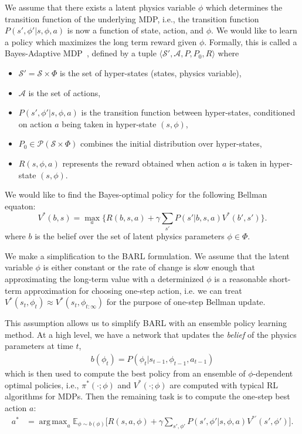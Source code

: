 \documentclass{article}
\DeclareMathOperator*{\argmax}{arg\,max}
\begin{document}
We assume that there exists a latent physics variable $\phi$ which determines the transition function of the underlying MDP, i.e., the transition function  $P(s',\phi' |s, \phi, a)$ is now a function of state, action, and $\phi$. We would like to learn a policy which maximizes the long term reward given $\phi$. Formally, this is called a Bayes-Adaptive MDP~\cite{ghavamzadeh2015bayesian, ross2008bayes, guez2012efficient}, defined by a tuple $\langle \mathcal{S}', \mathcal{A}, P, P_0, R \rangle$ where
\begin{itemize}
\item $\mathcal{S'} = \mathcal{S}\times \Phi$ is the set of hyper-states (states, physics variable),
\item $\mathcal{A}$ is the set of actions,
\item $P(s',\phi'|s, \phi, a)$ is the transition function between hyper-states, conditioned
on action $a$ being taken in hyper-state $(s, \phi)$,
\item $P_0\in \mathcal{P}(\mathcal{S} \times \Phi)$ combines the initial distribution over hyper-states,
\item $R(s, \phi, a)$ represents the reward obtained when action $a$ is
taken in hyper-state $(s,\phi)$.
\end{itemize}

We would like to find the Bayes-optimal policy for the following Bellman equaton:
\begin{equation}\label{eq:rl}
V^*(b, s) = \max_a \bigg\{R(b, s, a) + \gamma \sum_{s'}P(s'|b, s, a)V^*(b', s') \bigg\}.
\end{equation}
where $b$ is the belief over the set of latent physics parameters $\phi \in \Phi$.

We make a simplification to the BARL formulation. We assume that the latent variable $\phi$ is either constant or the rate of change is slow enough that approximating the long-term value with a determinized $\phi$ is a reasonable short-term approximation for choosing one-step action, i.e. we can treat $V^*(s_t, \phi_t) \approx V^*(s_t, \phi_{t:\infty})$ for the purpose of one-step Bellman update.

This assumption allows us to simplify BARL with an ensemble policy learning method. At a high level, we have a network that updates the \emph{belief} of the physics parameters at time $t$,
\begin{align*}
b(\phi_t) = P(\phi_t|s_{t-1}, \phi_{t-1}, a_{t-1})
\end{align*}
which is then used to compute the best policy from an ensemble of $\phi$-dependent optimal policies, i.e., $\pi^*(\cdot;\phi)$ and $V^*(\cdot;\phi)$ are computed with typical RL algorithms for MDPs. Then the remaining task is to compute the one-step best action $a$:
\begin{align}\label{eq:barl}
 a^* &= \argmax_{a} \mathbb{E}_{\phi \sim b(\phi)} \bigg[R(s, a, \phi) + \gamma \sum_{s', \phi'}P(s',\phi'|s, \phi, a)V^{*'}(s', \phi') \bigg].
\end{align}
\end{document}
